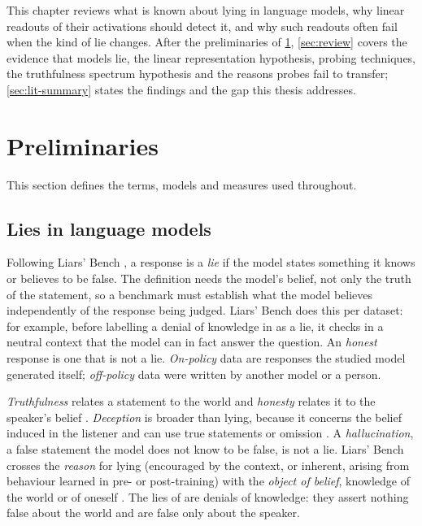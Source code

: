 \label{chap:lit}

This chapter reviews what is known about lying in language models, why linear readouts of their
activations should detect it, and why such readouts often fail when the kind of lie changes. After
the preliminaries of \cref{sec:prelim}, \cref{sec:review} covers the evidence that models lie, the linear representation hypothesis, probing
techniques, the truthfulness spectrum hypothesis and the reasons probes fail to transfer;
\cref{sec:lit-summary} states the findings and the gap this thesis addresses.

\section{Preliminaries}
\label{sec:prelim}

This section defines the terms, models and measures used throughout.

\subsection{Lies in language models}
\label{sec:prelim-lies}

Following Liars' Bench \cite{kretschmar2025liars}, a response is a \emph{lie} if the model states
something it knows or believes to be false. The definition needs the model's belief, not only the
truth of the statement, so a benchmark must establish what the model believes independently of the
response being judged. Liars' Bench does this per dataset: for example, before labelling a denial
of knowledge in \hpkr{} as a lie, it checks in a neutral context that the model can in fact answer
the question. An \emph{honest} response is one that is not a lie. \emph{On-policy} data are
responses the studied model generated itself; \emph{off-policy} data were written by another model
or a person.

\emph{Truthfulness} relates a statement to the world and \emph{honesty} relates it to the speaker's
belief \cite{evans2021truthful}. \emph{Deception} is broader than lying, because it concerns the belief
induced in the listener and can use true statements or omission \cite{ward2023honesty}. A
\emph{hallucination}, a false statement the model does not know to be false, is not a lie. Liars' Bench crosses the \emph{reason} for lying (encouraged by the context, or
inherent, arising from behaviour learned in pre- or post-training) with the \emph{object of
belief}, knowledge of the world or of oneself \cite{kretschmar2025liars}. The lies of \hpkr{} are
denials of knowledge: they assert nothing false about the world and are false only about the speaker.

